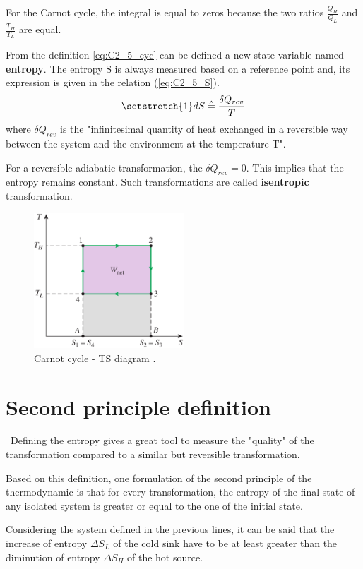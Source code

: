 For the Carnot cycle, the integral is equal to zeros because the two ratios $\frac{Q_H}{Q_L}$ and $\frac{T_H}{T_L}$ are equal.

From the definition \ref{eq:C2_5_cyc} can be defined a new state variable named \textbf{entropy}. The entropy S is always measured based on a reference point and, its expression is given in the relation (\ref{eq:C2_5_S}).
\begin{equation}
\setstretch{1}
dS \triangleq \frac{\delta Q_{rev}}{T}\label{eq:C2_5_S}
\end{equation}
where $\delta Q_{rev}$ is the "infinitesimal quantity of heat exchanged in a reversible way between the system and the environment at the temperature T"\cite{Dewallef2019}. 

For a reversible adiabatic transformation, the $\delta Q_{rev}=0$. This implies that the entropy remains constant. Such transformations are called \textbf{isentropic} transformation.
\begin{figure}[h]
\centering
\includegraphics[width=0.5\textwidth]{Carnot_TS.png}
\caption{Carnot cycle - TS diagram \cite{2015}.}
\label{fig:C2_5_CarnotTS}
\end{figure}
\section{Second principle definition}
\quad\, Defining the entropy gives a great tool to measure the "quality" of the transformation compared to a similar but reversible transformation.

Based on this definition, one formulation of the second principle of the thermodynamic is that for every transformation, the entropy of the final state of any isolated system is greater or equal to the one of the initial state.

Considering the system defined in the previous lines, it can be said that the increase of entropy $\Delta S_L$ of the cold sink have to be at least greater than the diminution of entropy $\Delta S_H$ of the hot source.

